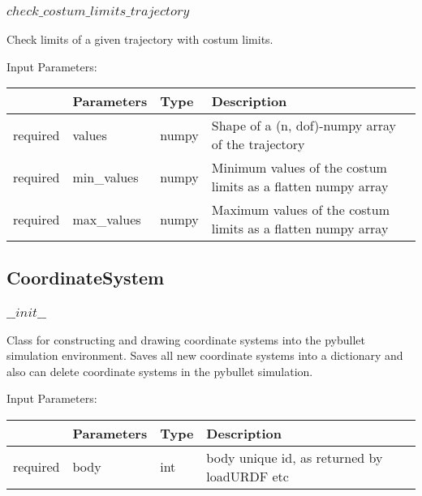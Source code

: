\documentclass[
	ngerman,
	accentcolor=9c,%
	type=intern,
	marginpar=false
	]{tudapub}
\begin{document}
\subsubsection{$check\_costum\_limits\_trajectory$}
\noindent Check limits of a given trajectory with costum limits.

\vspace{0.5cm}
\noindent Input Parameters:
\vspace{0.5cm}

\begin{tabular}{|p{}|p{}|p{}| p{}|}
\hline
 & \textbf{Parameters} & \textbf{Type} & \textbf{Description} \\
\hline
required & values & numpy & Shape of a (n, dof)-numpy array of the trajectory \\
\hline
required & min\_values & numpy & Minimum values of the costum limits as a flatten numpy array \\
\hline
required & max\_values & numpy & Maximum values of the costum limits as a flatten numpy array\\
\hline
\end{tabular}
\vspace{1cm}


\subsection{CoordinateSystem}
\subsubsection{$\_\_init\_\_$}
\noindent Class for constructing and drawing coordinate systems into the pybullet simulation environment. Saves all new coordinate systems into a dictionary and also can delete coordinate systems in the pybullet simulation.

\vspace{0.5cm}
\noindent Input Parameters:
\vspace{0.5cm}

\begin{tabular}{|p{}|p{}|p{}| p{}|}
\hline
 & \textbf{Parameters} & \textbf{Type} & \textbf{Description} \\
\hline
required & body & int & body unique id, as returned by loadURDF etc \\
\hline
\end{tabular}
\vspace{1cm}
\end{document}
